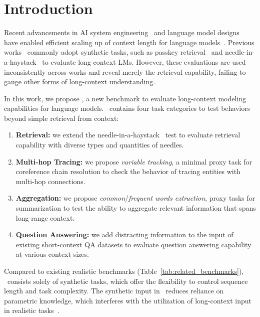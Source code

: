\section{Introduction}
Recent advancements in AI system engineering~\citep{fa,jacobs2023deepspeed,fu2024data} and language model designs~\citep{pi,abf} have enabled efficient scaling up of context length for language models~\citep{lwm, yi}. Previous works~\citep{jamba, grok, gemini, claude3} commonly adopt synthetic tasks, such as passkey retrieval~\citep{landmark} and needle-in-a-haystack~\citep{needle} to evaluate long-context LMs. However, these evaluations are used inconsistently across works and reveal merely the retrieval capability, failing to gauge other forms of long-context understanding. 

In this work, we propose , a new benchmark to evaluate long-context modeling capabilities for language models. 
~contains four task categories to test behaviors~\citep{ribeiro-etal-2020-beyond} beyond simple retrieval from context:
\begin{enumerate}[leftmargin=*]
    \item \textbf{Retrieval:} we extend the needle-in-a-haystack~\citep[][NIAH]{needle} test to evaluate retrieval capability with diverse types and quantities of needles.
    \item \textbf{Multi-hop Tracing:} we propose \emph{variable tracking}, a minimal proxy task for coreference chain resolution to check the behavior of tracing entities with multi-hop connections. 
    \item \textbf{Aggregation:} we propose \emph{common}/\emph{frequent words extraction}, proxy tasks for summarization to test the ability to aggregate relevant information that spans long-range context.
    \item \textbf{Question Answering:} we add distracting information to the input of existing short-context QA datasets to evaluate question answering capability at various context sizes. 
\end{enumerate}
Compared to existing realistic benchmarks (Table~\ref{tab:related_benchmarks}), ~consists solely of synthetic tasks, which offer the flexibility to control sequence length and task complexity. 
The synthetic input in ~reduces reliance on parametric knowledge, which interferes with the utilization of long-context input in realistic tasks~\citep{zeroscrolls, longbench}.


